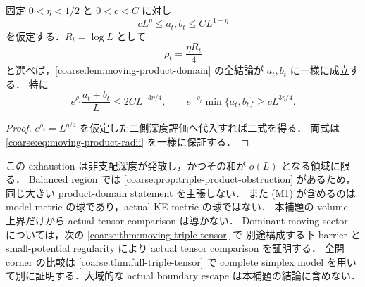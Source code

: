 \begin{corollary}
\label{coarse:cor:moving-product-eta-radius}
固定 $0<\eta<1/2$ と $0<c<C$ に対し
\[
 cL^\eta\le a_t,b_t\le CL^{1-\eta}
\]
を仮定する．$R_t=\log L$ として
\begin{equation}\label{coarse:eq:moving-product-eta-radius}
 \rho_t=\frac{\eta R_t}{4}
\end{equation}
と選べば，\cref{coarse:lem:moving-product-domain} の全結論が $a_t,b_t$ に一様に成立する．
特に
\[
 e^{\rho_t}\frac{a_t+b_t}{L}\le2CL^{-3\eta/4},
 \qquad
 e^{-\rho_t}\min\{a_t,b_t\}\ge cL^{3\eta/4}.
\]
\end{corollary}

\begin{proof}
$e^{\rho_t}=L^{\eta/4}$ を仮定した二側深度評価へ代入すれば二式を得る．
両式は \eqref{coarse:eq:moving-product-radii} を一様に保証する．
\end{proof}

\begin{remark}\label{coarse:rem:moving-sector-versus-balanced}
この exhaustion は非支配深度が発散し，かつその和が $o(L)$ となる領域に限る．
Balanced region では \cref{coarse:prop:triple-product-obstruction} があるため，
同じ大きい product-domain statement を主張しない．
また (M1) が含めるのは model metric の球であり，actual KE metric の球ではない．
本補題の volume 上界だけから actual tensor comparison は導かない．
Dominant moving sector については，次の \cref{coarse:thm:moving-triple-tensor} で
別途構成する下 barrier と small-potential regularity により actual tensor comparison を証明する．
全閉 corner の比較は \cref{coarse:thm:full-triple-tensor} で complete simplex model を用いて別に証明する．大域的な actual boundary escape は本補題の結論に含めない．
\end{remark}

